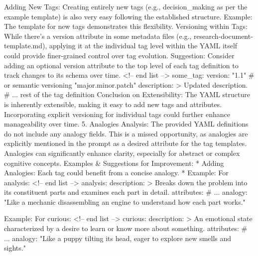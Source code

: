 Adding New Tags: Creating entirely new tags (e.g., decision_making as per the example template) is also very easy following the established structure.
Example: The template for new tags demonstrates this flexibility.
Versioning within Tags: While there's a version attribute in some metadata files (e.g., research-document-template.md), applying it at the individual tag level within the YAML itself could provide finer-grained control over tag evolution.
Suggestion: Consider adding an optional version attribute to the top level of each tag definition to track changes to its schema over time. <!-- end list --> some_tag: version: "1.1" # or semantic versioning "major.minor.patch" description: > Updated description. # ... rest of the tag definition
Conclusion on Extensibility: The YAML structure is inherently extensible, making it easy to add new tags and attributes. Incorporating explicit versioning for individual tags could further enhance manageability over time.
5. Analogies
Analysis: The provided YAML definitions do not include any analogy fields. This is a missed opportunity, as analogies are explicitly mentioned in the prompt as a desired attribute for the tag templates. Analogies can significantly enhance clarity, especially for abstract or complex cognitive concepts.
Examples & Suggestions for Improvement:
 * Adding Analogies: Each tag could benefit from a concise analogy.
   * Example: For analysis:
     <!-- end list -->
   analysis:
  description: >
    Breaks down the problem into its constituent parts and examines each part in detail.
  attributes:
    # ...
  analogy: "Like a mechanic disassembling an engine to understand how each part works."

Example: For curious:
<!-- end list -->
curious:
description: >
An emotional state characterized by a desire to learn or know more about something.
attributes:
# ...
analogy: "Like a puppy tilting its head, eager to explore new smells and sights."

